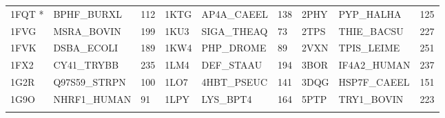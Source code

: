 \documentclass{bioinfo}
\begin{document}
\begin{table}[!t]
{\begin{tabular}{lllllllll}
    1FQT *   & BPHF\_BURXL  & 112             & 1KTG   & AP4A\_CAEEL  & 138             & 2PHY   & PYP\_HALHA   & 125             \\
    1FVG   & MSRA\_BOVIN  & 199             & 1KU3   & SIGA\_THEAQ  & 73              & 2TPS   & THIE\_BACSU  & 227             \\
    1FVK   & DSBA\_ECOLI  & 189             & 1KW4   & PHP\_DROME   & 89              & 2VXN   & TPIS\_LEIME  & 251             \\
    1FX2   & CY41\_TRYBB  & 235             & 1LM4   & DEF\_STAAU   & 194             & 3BOR   & IF4A2\_HUMAN & 237             \\
    1G2R   & Q97S59\_STRPN & 100             & 1LO7   & 4HBT\_PSEUC  & 141             & 3DQG   & HSP7F\_CAEEL & 151             \\
    1G9O   & NHRF1\_HUMAN & 91              & 1LPY   & LYS\_BPT4    & 164             & 5PTP   & TRY1\_BOVIN  & 223             \\ \botrule
\end{tabular}}{}
\end{table}
\end{document}
